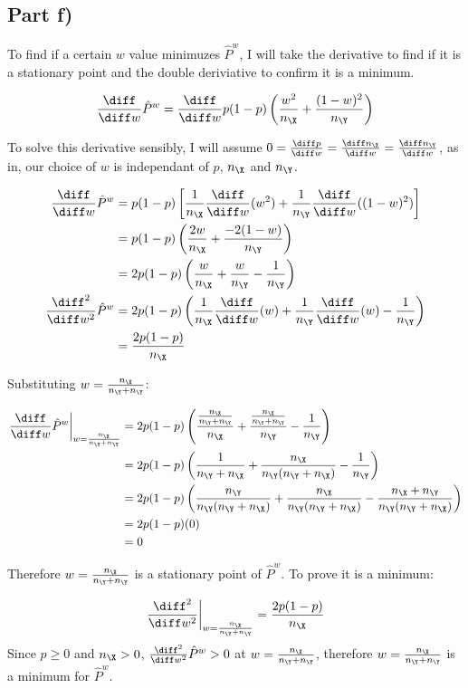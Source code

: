 \subsection{Part f)}
To find if a certain $w$ value minimuzes $\hat{P}^w$, I will take the derivative to find if it is a stationary point and the double deriviative
to confirm it is a minimum.

\[
\frac{\diff}{\diff w} \hat{P}^w = \frac{\diff}{\diff w} p(1-p)\left( \frac{w^2}{n_\X} + \frac{(1-w)^2}{n_\Y} \right)
\]

To solve this derivative sensibly, I will assume $0 = \frac{\diff p}{\diff w} = \frac{\diff n_\X}{\diff w} = \frac{\diff n_\Y}{\diff w}$,
as in, our choice of $w$ is independant of $p$, $n_\X$ and $n_\Y$.

\begin{align*}
\frac{\diff}{\diff w} \hat{P}^w &= p(1-p)\left[ \frac{1}{n_\X} \frac{\diff}{\diff w}(w^2) + \frac{1}{n_\Y} \frac{\diff}{\diff w}((1-w)^2) \right] \\
&= p(1-p) \left( \frac{2w}{n_\X} + \frac{-2(1-w)}{n_\Y} \right) \\
&= 2p(1-p) \left( \frac{w}{n_\X} + \frac{w}{n_\Y} - \frac{1}{n_\Y} \right) \\
\frac{\diff^2}{\diff w^2} \hat{P}^w &= 2p(1-p)\left( \frac{1}{n_\X} \frac{\diff}{\diff w}(w) + \frac{1}{n_\Y}\frac{\diff}{\diff w}(w) - \frac{1}{n_\Y} \right) \\
&= \frac{2p(1 - p)}{n_\X}
\end{align*}

Substituting $w = \frac{n_\X}{n_\Y + n_\Y}$:

\begin{align*}
\left. \frac{\diff}{\diff w} \hat{P}^w \right| _{w = \frac{n_\X}{n_\Y + n_\Y}} &= 2p(1-p)\left(
\frac{\frac{n_\X}{n_\Y + n_\Y}}{n_\X} + \frac{\frac{n_\X}{n_\Y + n_\Y}}{n_\Y} - \frac{1}{n_\Y} \right) \\
&= 2p(1-p)\left( \frac{1}{n_\Y + n_\X} + \frac{n_\X}{n_\Y(n_\Y + n_\X)} - \frac{1}{n_\Y} \right) \\
&= 2p(1-p)\left( \frac{n_\Y}{n_\Y(n_\Y + n_\X)} + \frac{n_\X}{n_\Y(n_\Y + n_\X)} - \frac{n_\X + n_\Y}{n_\Y(n_\Y + n_\X)} \right) \\
&= 2p(1-p)(0) \\
&= 0
\end{align*}

Therefore $w = \frac{n_\X}{n_\Y + n_\Y}$ is a stationary point of $\hat{P}^w$. To prove it is a minimum:

\[
\left. \frac{\diff^2}{\diff w^2} \right| _{w = \frac{n_\X}{n_\Y + n_\Y}} = \frac{2p(1 - p)}{n_\X}
\]
Since $p \geq 0$ and $n_\X > 0$, $\frac{\diff^2}{\diff w^2} \hat{P}^w > 0$ at $w = \frac{n_\X}{n_\Y + n_\Y}$, therefore $w = \frac{n_\X}{n_\Y + n_\Y}$ is a minimum for $\hat{P}^w$.
